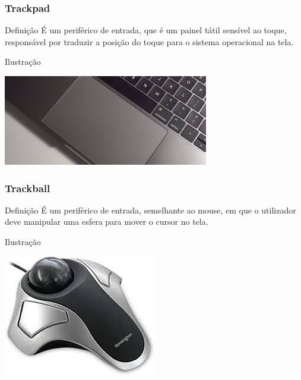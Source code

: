 \documentclass[aspectratio=169]{beamer} %
\begin{document}
\begin{frame}
	\frametitle{Trackpad}
	
	\begin{block}{Defini\c cão}
		É um periférico de entrada, que é um painel tátil sensível ao toque, responsável por traduzir a posição do toque para o sistema operacional na tela.
	\end{block}\vfill
	
	\begin{exampleblock}{Ilustra\c cão}
		\begin{center}
			\includegraphics[scale=0.4]{img/trackpad}
		\end{center}		
	\end{exampleblock}
\end{frame}

\begin{frame}
	\frametitle{Trackball}
	
	\begin{block}{Defini\c cão}
		É um periférico de entrada,  semelhante ao mouse, em que o utilizador deve manipular uma esfera para mover o cursor no tela.
	\end{block}\vfill
	
	\begin{exampleblock}{Ilustra\c cão}
		\begin{center}
			\includegraphics[scale=0.4]{img/trackball}
		\end{center}		
	\end{exampleblock}
\end{frame}
\end{document}
